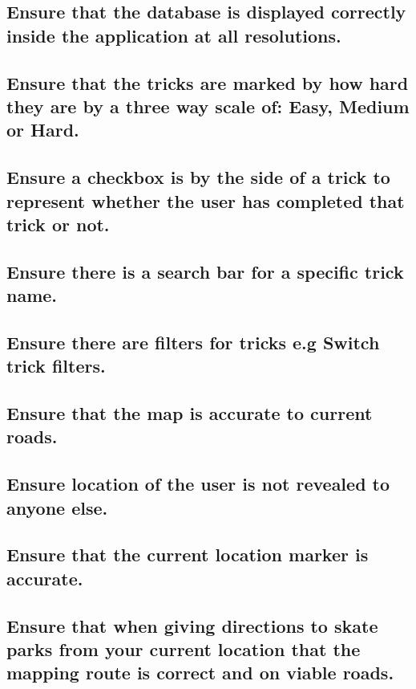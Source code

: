 \subsection {Ensure that the database is displayed correctly inside the application at all resolutions.}

\subsection {Ensure that the tricks are marked by how hard they are by a three way scale of: Easy, Medium or Hard.}

\subsection {Ensure a checkbox is by the side of a trick to represent whether the user has completed that trick or not.}

\subsection {Ensure there is a search bar for a specific trick name.}

\subsection {Ensure there are filters for tricks e.g Switch trick filters.}



\subsection {Ensure that the map is accurate to current roads.}

\subsection {Ensure location of the user is not revealed to anyone else.}

\subsection {Ensure that the current location marker is accurate.}

\subsection {Ensure that when giving directions to skate parks from your current location that the mapping route is correct and on viable roads. }

